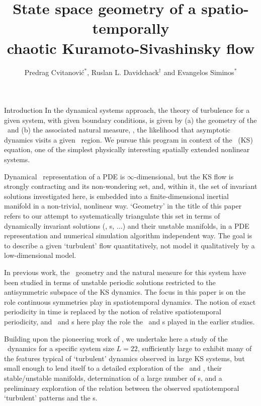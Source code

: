 \documentclass{theo1poster}[2003/04/25]
\title{State space geometry of a spatio-temporally\\ chaotic
Kuramoto-Sivashinsky flow}
\author{Predrag Cvitanovi\'c\ensuremath{^*}, Ruslan L. Davidchack\ensuremath{^\dagger} and Evangelos Siminos\ensuremath{^*}}
\begin{document}
\begin{poster}{3}

\begin{sheet}{Introduction}
In the dynamical systems approach, the
theory of turbulence for a given system, with given boundary conditions,
is given by (a) the geometry of the \statesp\ and (b) the associated natural measure,
\ie, the likelihood that asymptotic dynamics visits a given \statesp\ region.
We pursue this program in context of the \KS\ (KS) equation,
one of the simplest physically interesting spatially extended
nonlinear systems.

Dynamical \statesp\ representation of a PDE is $\infty$-dimensional,
but the KS flow is strongly contracting and its non-wondering set,
and, within it, the set of invariant solutions investigated here, is
embedded into a finite-dimensional inertial manifold in
a non-trivial, nonlinear way. `Geometry' in the title of this paper
refers to our attempt to systematically triangulate this set in
terms of dynamically invariant solutions (\eqva, \po s, $\ldots$)
and their unstable manifolds, in a PDE representation and numerical simulation algorithm 
independent way. The goal is to describe a given
`turbulent' flow quantitatively, not model it qualitatively by a
low-dimensional model.

In previous work, the \statesp\ geometry and the natural measure for
this system have been
studied in terms of unstable
periodic solutions restricted to the antisymmetric subspace of the
KS dynamics. The focus in this paper is on the role continuous symmetries play in
spatiotemporal dynamics.
The notion of exact periodicity in time is
replaced by the notion of relative spatiotemporal
periodicity, and \reqva\ and \rpo s here play the role the \eqva\
and \po s played in the earlier studies. 

Building upon the pioneering work of ,
we undertake here
a study of the \KS\ dynamics
for a specific system size $L = 22$, sufficiently large
to exhibit many of the features typical of `turbulent' dynamics
observed in large KS systems, but small enough to lend itself to a
detailed exploration of the  \eqva\ and \reqva,
their stable/unstable manifolds,
determination of a large number of
\rpo s, and a preliminary exploration of the relation between the
observed spatiotemporal `turbulent' patterns and the \rpo s.

\end{sheet}



\end{poster}
\end{document}
